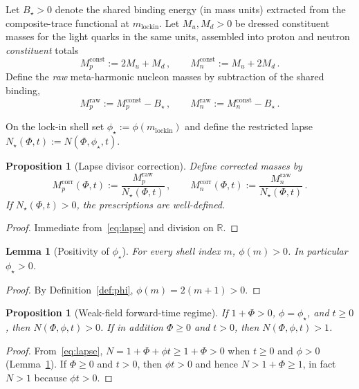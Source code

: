 \documentclass[11pt,a4paper]{article}
\theoremstyle{plain}
\newtheorem{lemma}[theorem]{Lemma}
\newtheorem{proposition}[theorem]{Proposition}
\theoremstyle{definition}
\theoremstyle{remark}
\theoremstyle{plain}
\theoremstyle{definition}
\begin{document}
Let $B_{\star}>0$ denote the shared binding energy (in mass units) extracted from the composite-trace functional at $m_{\mathrm{lockin}}$.
Let $M_u,M_d>0$ be dressed constituent masses for the light quarks in the same units, assembled into proton and neutron \emph{constituent} totals
\[
  M_p^{\mathrm{const}} := 2M_u+M_d\,,\qquad M_n^{\mathrm{const}} := M_u+2M_d\,.
\]
Define the \emph{raw} meta-harmonic nucleon masses by subtraction of the shared binding,
\begin{equation}\label{eq:rawmass}
  M_p^{\mathrm{raw}} := M_p^{\mathrm{const}}-B_{\star}\,,\qquad
  M_n^{\mathrm{raw}} := M_n^{\mathrm{const}}-B_{\star}\,.
\end{equation}

On the lock-in shell set $\phi_{\star}:=\phi(m_{\mathrm{lockin}})$ and define the restricted lapse $N_{\star}(\Phi,t):=N(\Phi,\phi_{\star},t)$.

\begin{proposition}[Lapse divisor correction]\label{prop:divisor}
Define corrected masses by
\[
  M_p^{\mathrm{corr}}(\Phi,t):=\frac{M_p^{\mathrm{raw}}}{N_{\star}(\Phi,t)}\,,\qquad
  M_n^{\mathrm{corr}}(\Phi,t):=\frac{M_n^{\mathrm{raw}}}{N_{\star}(\Phi,t)}\,.
\]
If $N_{\star}(\Phi,t)>0$, the prescriptions are well-defined.
\end{proposition}

\begin{proof}
Immediate from~\eqref{eq:lapse} and division on $\mathbb{R}$.
\end{proof}

\begin{lemma}[Positivity of $\phi_{\star}$]\label{lem:phipos}
For every shell index $m$, $\phi(m)>0$.
In particular $\phi_{\star}>0$.
\end{lemma}

\begin{proof}
By Definition~\ref{def:phi}, $\phi(m)=2(m+1)>0$.
\end{proof}

\begin{proposition}[Weak-field forward-time regime]\label{prop:Npos}
If $1+\Phi>0$, $\phi=\phi_{\star}$, and $t\ge 0$, then $N(\Phi,\phi,t)>0$.
If in addition $\Phi\ge 0$ and $t>0$, then $N(\Phi,\phi,t)>1$.
\end{proposition}

\begin{proof}
From~\eqref{eq:lapse}, $N=1+\Phi+\phi t\ge 1+\Phi>0$ when $t\ge 0$ and $\phi>0$ (Lemma~\ref{lem:phipos}).
If $\Phi\ge 0$ and $t>0$, then $\phi t>0$ and hence $N>1+\Phi\ge 1$, in fact $N>1$ because $\phi t>0$.
\end{proof}
\end{document}
